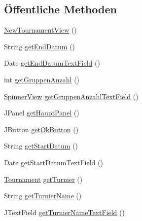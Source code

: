 \subsection*{Öffentliche Methoden}
\begin{DoxyCompactItemize}
\item 
\hyperlink{classde_1_1turnierverwaltung_1_1view_1_1_new_tournament_view_a93d65113b1cf9c5fcc306c65319e34f0}{New\+Tournament\+View} ()
\item 
String \hyperlink{classde_1_1turnierverwaltung_1_1view_1_1_new_tournament_view_a0a227f057e66f0d0f36583edc0d59769}{get\+End\+Datum} ()
\item 
Date \hyperlink{classde_1_1turnierverwaltung_1_1view_1_1_new_tournament_view_a49bb352b266add9d0445a66266982941}{get\+End\+Datum\+Text\+Field} ()
\item 
int \hyperlink{classde_1_1turnierverwaltung_1_1view_1_1_new_tournament_view_a598b66c7373fc5c147bc00d4efc5f577}{get\+Gruppen\+Anzahl} ()
\item 
\hyperlink{classde_1_1turnierverwaltung_1_1view_1_1_spinner_view}{Spinner\+View} \hyperlink{classde_1_1turnierverwaltung_1_1view_1_1_new_tournament_view_a663426212bc1d6a8a9b942ec0c8421e8}{get\+Gruppen\+Anzahl\+Text\+Field} ()
\item 
J\+Panel \hyperlink{classde_1_1turnierverwaltung_1_1view_1_1_new_tournament_view_aa9b0ec3bcf173ed51b501afdfa577020}{get\+Haupt\+Panel} ()
\item 
J\+Button \hyperlink{classde_1_1turnierverwaltung_1_1view_1_1_new_tournament_view_a2fa1f2e900132058fc73203f3d64995a}{get\+Ok\+Button} ()
\item 
String \hyperlink{classde_1_1turnierverwaltung_1_1view_1_1_new_tournament_view_a20446dcc17fae305815ac3ddd7275e76}{get\+Start\+Datum} ()
\item 
Date \hyperlink{classde_1_1turnierverwaltung_1_1view_1_1_new_tournament_view_acc23460900f94951dd7ddf8945578584}{get\+Start\+Datum\+Text\+Field} ()
\item 
\hyperlink{classde_1_1turnierverwaltung_1_1model_1_1_tournament}{Tournament} \hyperlink{classde_1_1turnierverwaltung_1_1view_1_1_new_tournament_view_a114b9fd9991f9acfc0dac46d49beedc3}{get\+Turnier} ()
\item 
String \hyperlink{classde_1_1turnierverwaltung_1_1view_1_1_new_tournament_view_a7111e50c04249697d1397e39cd865556}{get\+Turnier\+Name} ()
\item 
J\+Text\+Field \hyperlink{classde_1_1turnierverwaltung_1_1view_1_1_new_tournament_view_ad1b2c8f15f949f16b6e49aa85d19ad4f}{get\+Turnier\+Name\+Text\+Field} ()

\end{DoxyCompactItemize}
